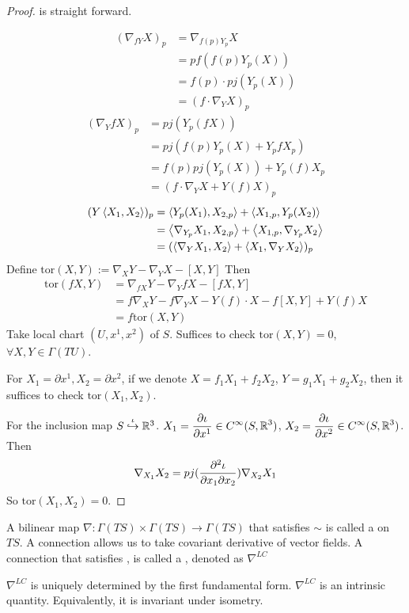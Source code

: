 \begin{proof}
     is straight forward.

    \begin{align*}
        (\nabla_{fY}X)_p&=\nabla_{f(p)Y_p}X\\
        &=pf(f(p)Y_p(X))\\
        &=f(p)\cdot pj(Y_p(X))\\
        &=(f\cdot \nabla_YX)_p
    \end{align*}
       \begin{align*}
        (\nabla_YfX )_p&=pj(Y_p(fX))\\
        &=pj(f(p)Y_p(X)+Y_pfX_p)\\
        &=f(p)pj(Y_p(X))+Y_p(f)X_p\\
        &=(f\cdot \nabla_YX+Y(f)X)_p
    \end{align*}
    \begin{align*}
        (Y\left<X_1,X_2\right>)_p&=\left<Y_p(X_1),X_{2,p}\right>+\left<X_{1,p},Y_p(X_2)\right>\\
        &=\left<\nabla_{Y_p}X_1,X_{2,p}\right>+\left<X_{1,p},\nabla_{Y_p}X_2\right>\\
        &=(\left<\nabla_YX_1,X_2\right>+\left<X_1,\nabla_YX_2\right>)_p
    \end{align*}
     Define $ \mathrm{tor}(X,Y):=\nabla_XY-\nabla_YX-[X,Y] $ 
    Then 
    \begin{align*}
        \mathrm{tor}(fX,Y)&=\nabla_{fX}Y-\nabla_YfX-[fX,Y]\\
        &=f\nabla_XY-f\nabla_YX-Y(f)\cdot X-f[X,Y]+Y(f)X\\
        &=f\mathrm{tor}(X,Y)
    \end{align*}
    Take local chart  $ (U,x^1,x^2) $ of  $ S $. Suffices to check  $ \mathrm{tor}(X,Y)=0 $, $ \forall X,Y\in \Gamma(TU) $.   
    
    For  $ X_1=\partial x^1,X_2=\partial x^2 $, if  we denote  $ X=f_1X_1+f_2X_2 $,  $ Y=g_1X_1+g_2X_2 $,
    then it   suffices to check  $ \mathrm{tor}(X_1,X_2) $.

    For the inclusion map  $ S\overset{\iota}{\hookrightarrow}\mathbb R^3 $.  $ X_1=\displaystyle\frac{\partial \iota}{\partial x^1}\in C^\infty(S,\mathbb R^3) $,  $ X_2=\displaystyle\frac{\partial \iota}{\partial x^2}\in C^\infty(S,\mathbb R^3) $. Then 
    \[\nabla_{X_1}X_2=pj(\displaystyle\frac{\partial^2\iota}{\partial x_1\partial x_2})\nabla_{X_2}X_1\]
    So  $ \mathrm{tor}(X_1,X_2)=0 $.    
\end{proof}

\begin{definition}
    A bilinear map  $ \nabla:\Gamma(TS)\times \Gamma(TS)\rightarrow \Gamma(TS) $ that satisfies  $ \sim $  is called  a  on  $ TS $. A connection allows us to take covariant derivative of vector fields. A connection that satisfies , is called a , denoted as  $ \nabla^{LC} $  
\end{definition}
\begin{theorem}
    $ \nabla^{LC} $ is uniquely determined by the first fundamental form. \ie  $ \nabla^{LC}$ is an intrinsic quantity. Equivalently, it is invariant under isometry.
\end{theorem}

